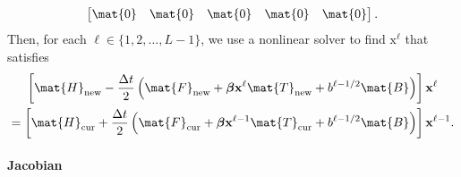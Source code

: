 \documentclass{jpmarticle}
\renewcommand{\vec}[1]{\boldsymbol{\mathrm{#1}}}
\let\subequationsorig\subequations%
\let\endsubequationsorig\endsubequations%
\renewenvironment{subequations}{
  \subequationsorig
  \renewcommand{\theequation}{\theparentequation.\arabic{equation}}
}{
  \endsubequationsorig
}
\begin{document}
\begin{subequations}
\begin{align}
\begin{bmatrix}
      \mat{0} & \mat{0} & \mat{0} & \mat{0} & \mat{0}
    \end{bmatrix}.
  \end{align}
  Then, for each $\ell \in \{1, 2, \ldots, L - 1\}$,
  we use a nonlinear solver to find $\vec{x}^{\ell}$ that satisfies
  \begin{multline}
    \label{step_age_structured}
    \left[
      \mat{H}_{\mathrm{new}}
      - \frac{\Delta t}{2}
      \left(
        \mat{F}_{\mathrm{new}}
        + \vec{\beta} \vec{x}^{\ell} \mat{T}_{\mathrm{new}}
        + b^{\ell - 1 / 2} \mat{B}
      \right)
    \right] \vec{x}^{\ell}
    \\
    = \left[
      \mat{H}_{\mathrm{cur}}
      + \frac{\Delta t}{2}
      \left(
        \mat{F}_{\mathrm{cur}}
        + \vec{\beta} \vec{x}^{\ell - 1} \mat{T}_{\mathrm{cur}}
        + b^{\ell - 1 / 2} \mat{B}
      \right)
    \right] \vec{x}^{\ell - 1}.
  \end{multline}
\end{subequations}


\paragraph{Jacobian}
\end{document}
